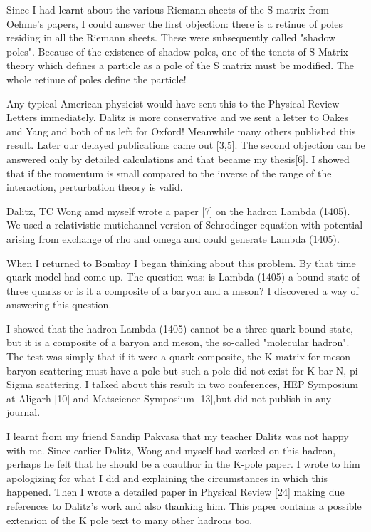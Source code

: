 Since I had learnt about the various Riemann sheets of the S matrix from 
Oehme's papers, I could answer the first objection: there is a retinue 
of poles residing in all the Riemann sheets. These were subsequently 
called "shadow poles". Because of the existence of shadow poles, one of 
the tenets of S Matrix theory which defines a particle as a pole of the 
S matrix must be modified. The whole retinue of poles define the 
particle!

Any typical American physicist would have sent this to the Physical 
Review Letters immediately. Dalitz is more conservative and we sent a 
letter to Oakes and Yang and both of us left for Oxford! Meanwhile many 
others published this result. Later our delayed publications came out 
[3,5]. The second objection can be answered only by detailed 
calculations and that became my thesis[6]. I showed that if the momentum 
is small compared to the inverse of the range of the interaction, 
perturbation theory is valid.

Dalitz, TC Wong amd myself wrote a paper [7] on the hadron Lambda 
(1405). We used a relativistic mutichannel version of Schrodinger 
equation with potential arising from exchange of rho and omega and could 
generate Lambda (1405).

When I returned to Bombay I began thinking about this problem. By that 
time quark model had come up. The question was: is Lambda (1405) a bound 
state of three quarks or is it a composite of a baryon and a meson? I 
discovered a way of answering this question.

I showed that the hadron Lambda (1405) cannot be a three-quark bound 
state, but it is a composite of a baryon and meson, the so-called 
"molecular hadron". The test was simply that if it were a quark 
composite, the K matrix for meson-baryon scattering must have a pole but 
such a pole did not exist for K bar-N, pi-Sigma scattering. I talked 
about this result in two conferences, HEP Symposium at Aligarh [10] and 
Matscience Symposium [13],but did not publish in any journal.

I learnt from my friend Sandip Pakvasa that my teacher Dalitz was not 
happy with me. Since earlier Dalitz, Wong and myself had worked on this 
hadron, perhaps he felt that he should be a coauthor in the K-pole 
paper. I wrote to him apologizing for what I did and explaining the 
circumstances in which this happened. Then I wrote a detailed paper in 
Physical Review [24] making due references to Dalitz's work and also 
thanking him. This paper contains a possible extension of the K pole 
text to many other hadrons too.

